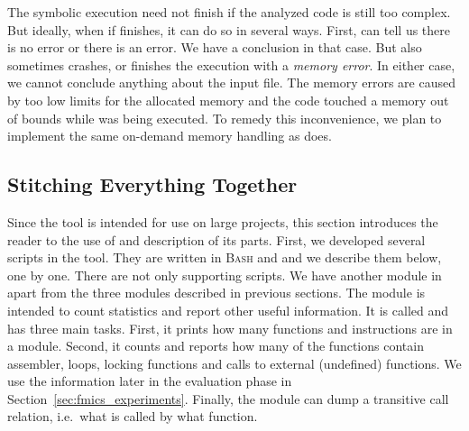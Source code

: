 The symbolic execution need not finish if the analyzed code is still too
complex. But ideally, when if finishes, it can do so in several ways. First,
\klee can tell us there is no error or there is an error. We have a conclusion
in that case.  But \klee also sometimes crashes, or finishes the execution
with a \emph{memory error}.  In either case, we cannot conclude anything about
the input file. The memory errors are caused by too low limits for the
allocated memory and the code touched a memory out of bounds while was being
executed.  To remedy this inconvenience, we plan to implement the same
on-demand memory handling as \ucklee does.

\subsection{Stitching Everything Together}
Since the tool is intended for use on large projects, this section introduces
the reader to the use of \symbio and description of its parts. First, we
developed several scripts in the tool.  They are written in \textsc{Bash} and
\perl and we describe them below, one by one.  There are not only supporting
scripts. We have another \llvm module in \symbio apart from the three modules
described in previous sections. The module is intended to count statistics and
report other useful information. It is called  and has three
main tasks.  First, it prints how many functions and instructions are in a
module.  Second, it counts and reports how many of the functions contain
assembler, loops, locking functions and calls to external (undefined)
functions. We use the information later in the evaluation phase in
Section~\ref{sec:fmics_experiments}. Finally, the module can dump a transitive
call relation, i.e.\ what is called by what function.


